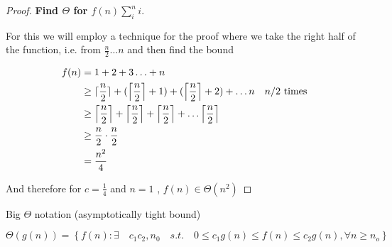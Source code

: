 \documentclass[../notes.tex]{subfiles}
\begin{document}
\begin{proof}

	\textbf{Find $ \Theta $ for $ f(n) \sum^n_i i $}.

	For this we will employ a technique for the proof where we take the right half of the function, i.e. from $ \frac{n}{2} \ldots n $ and then find the bound

	\begin{equation}
		\begin{split}
			f(n) &= 1 + 2 + 3 \ldots + n \\
			 &\ge \lceil \frac{n}{2} \rceil + (\left\lceil \frac{n}{2} \right\rceil + 1) + (\left\lceil \frac{n}{2} \right\rceil + 2) + \ldots n \quad \text{$ n/2 $ times} \\
			 &\ge \left\lceil \frac{n}{2} \right\rceil +   \left\lceil \frac{n}{2} \right\rceil + \left\lceil \frac{n}{2} \right\rceil +  \ldots \left\lceil \frac{n}{2} \right\rceil \\
			 &\ge \frac{n}{2} \cdot \frac{n}{2} \\
			 &= \frac{n^2}{4} \\
		\end{split}
	\end{equation}

	And therefore for $ c = \frac{1}{4} $  and $ n = 1 $ , $ f(n) \in \Theta(n^2) $ 
	
	
\end{proof}



\begin{definition}
	Big $ \Theta $  notation (asymptotically tight bound)

	\begin{equation}
		\Theta(g(n)) = \left\{ f(n) : \exists \quad c_1 c_2, n_0 \quad s.t. \quad 0 \le  c_1 g(n) \le  f(n) \le  c_2 g(n), \forall n \ge  n_o   \right\}
		\label{eq:358:bigTheta}
	\end{equation}
\end{definition}
\end{document}
